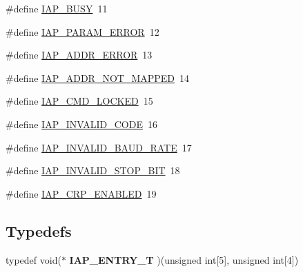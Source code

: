 \begin{DoxyCompactItemize}
\#define \hyperlink{group___c_o_m_m_o_n___i_a_p_gaa4e308bc310bb68aa8409a6f830aee04}{I\+A\+P\+\_\+\+B\+U\+S\+Y}~11
\item 
\#define \hyperlink{group___c_o_m_m_o_n___i_a_p_ga6bf1bec9cbb419f8006447171e9750b7}{I\+A\+P\+\_\+\+P\+A\+R\+A\+M\+\_\+\+E\+R\+R\+O\+R}~12
\item 
\#define \hyperlink{group___c_o_m_m_o_n___i_a_p_gaaff51c256373e4a20f8dab1adc1300f3}{I\+A\+P\+\_\+\+A\+D\+D\+R\+\_\+\+E\+R\+R\+O\+R}~13
\item 
\#define \hyperlink{group___c_o_m_m_o_n___i_a_p_ga4cfd7e0c133c450664f0a60bfbbd9eaa}{I\+A\+P\+\_\+\+A\+D\+D\+R\+\_\+\+N\+O\+T\+\_\+\+M\+A\+P\+P\+E\+D}~14
\item 
\#define \hyperlink{group___c_o_m_m_o_n___i_a_p_gafdceac1acd5c460094011136c08574a4}{I\+A\+P\+\_\+\+C\+M\+D\+\_\+\+L\+O\+C\+K\+E\+D}~15
\item 
\#define \hyperlink{group___c_o_m_m_o_n___i_a_p_ga456a8363a47d21d7198056da4b1e9f61}{I\+A\+P\+\_\+\+I\+N\+V\+A\+L\+I\+D\+\_\+\+C\+O\+D\+E}~16
\item 
\#define \hyperlink{group___c_o_m_m_o_n___i_a_p_ga6913ca0660dc1a2cccd8c6b09bcdbc75}{I\+A\+P\+\_\+\+I\+N\+V\+A\+L\+I\+D\+\_\+\+B\+A\+U\+D\+\_\+\+R\+A\+T\+E}~17
\item 
\#define \hyperlink{group___c_o_m_m_o_n___i_a_p_ga6c61111082b04ba6780151c83f8c3644}{I\+A\+P\+\_\+\+I\+N\+V\+A\+L\+I\+D\+\_\+\+S\+T\+O\+P\+\_\+\+B\+I\+T}~18
\item 
\#define \hyperlink{group___c_o_m_m_o_n___i_a_p_gaaccc191ce402e19b0c0ae399f614efe8}{I\+A\+P\+\_\+\+C\+R\+P\+\_\+\+E\+N\+A\+B\+L\+E\+D}~19
\end{DoxyCompactItemize}
\subsection*{Typedefs}
\begin{DoxyCompactItemize}
\item 
\hypertarget{group___c_o_m_m_o_n___i_a_p_ga8791110623b80cab258c4c4ecbb94560}{typedef void($\ast$ {\bfseries I\+A\+P\+\_\+\+E\+N\+T\+R\+Y\+\_\+\+T} )(unsigned int\mbox{[}5\mbox{]}, unsigned int\mbox{[}4\mbox{]})}\label{group___c_o_m_m_o_n___i_a_p_ga8791110623b80cab258c4c4ecbb94560}

\end{DoxyCompactItemize}
